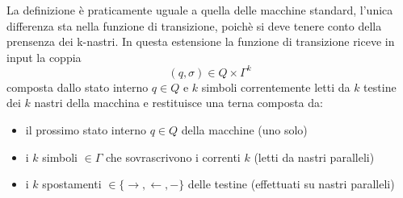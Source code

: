 La definizione è praticamente uguale a quella delle macchine standard, l'unica differenza sta nella funzione di transizione, poichè si deve 
tenere conto della prensenza dei k-nastri. In questa estensione la funzione di transizione riceve in input la coppia
\[ (q,\sigma) \in Q\times \Gamma^k  \]
composta dallo stato interno $q \in Q$ e $k$ simboli correntemente letti da $k$ testine dei $k$ nastri della macchina e restituisce una terna composta da:
\begin{itemize}
    \item il prossimo stato interno $q \in Q $ della macchine (uno solo)
    \item i $k$ simboli $\in \Gamma$ che sovrascrivono i correnti $k$ (letti da nastri paralleli)
    \item i $k$ spostamenti $\in \{ \rightarrow, \leftarrow, -  \}$ delle testine (effettuati su nastri paralleli)
\end{itemize}



